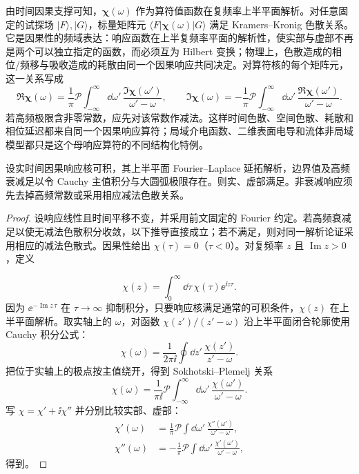 由时间因果支撑可知，$\boldsymbol\chi(\omega)$ 作为算符值函数在复频率上半平面解析。对任意固定的试探场 $|F\rangle,|G\rangle$，标量矩阵元
$\langle F|\boldsymbol\chi(\omega)|G\rangle$ 满足 Kramers--Kronig 色散关系。它是因果性的频域表达：响应函数在上半复频率平面的解析性，使实部与虚部不再是两个可以独立指定的函数，而必须互为 Hilbert 变换；物理上，色散造成的相位/频移与吸收造成的耗散由同一个因果响应共同决定。对算符核的每个矩阵元，这一关系写成
\begin{equation}
{
\Re\boldsymbol\chi(\omega)
=\frac1\pi\mathcal P\int_{-\infty}^{\infty}\dd\omega'\,
\frac{\Im\boldsymbol\chi(\omega')}{\omega'-\omega},
\qquad
\Im\boldsymbol\chi(\omega)
=-\frac1\pi\mathcal P\int_{-\infty}^{\infty}\dd\omega'\,
\frac{\Re\boldsymbol\chi(\omega')}{\omega'-\omega}.}
\label{eq:material_kramers_kronig}
\end{equation}
若高频极限含非零常数，应先对该常数作减法。这样时间色散、空间色散、耗散和相位延迟都来自同一个因果响应算符；局域介电函数、二维表面电导和流体非局域模型都只是这个母响应算符的不同结构化特例。

\begin{theorem}
设实时间因果响应核可积，其上半平面 Fourier--Laplace 延拓解析，边界值及高频衰减足以令 Cauchy 主值积分与大圆弧极限存在。则实、虚部满足。非衰减响应须先去掉高频常数或采用相应减法色散关系。
\end{theorem}
\begin{proof}
设响应线性且时间平移不变，并采用前文固定的 Fourier 约定。若高频衰减足以使无减法色散积分收敛，以下推导直接成立；若不满足，则对同一解析论证采用相应的减法色散式。因果性给出 $\chi(\tau)=0$（$\tau<0$）。对复频率 $z$ 且 $\operatorname{Im}z>0$，定义

\[
\chi(z)=\int_0^\infty\dd\tau\,\chi(\tau)\ee^{\ii z\tau}.
\]
因为 $\ee^{-\operatorname{Im}z\,\tau}$ 在 $\tau\to\infty$ 抑制积分，只要响应核满足通常的可积条件，$\chi(z)$ 在上半平面解析。取实轴上的 $\omega$，对函数 $\chi(z')/(z'-\omega)$ 沿上半平面闭合轮廓使用 Cauchy 积分公式：
\[
\chi(\omega)
=\frac{1}{2\pi\ii}
\oint\dd z'\,
\frac{\chi(z')}{z'-\omega}.
\]
把位于实轴上的极点按主值绕开，得到 Sokhotski--Plemelj 关系
\[
\chi(\omega)
=\frac{1}{\pi\ii}\mathcal P
\int_{-\infty}^{\infty}\dd\omega'\,
\frac{\chi(\omega')}{\omega'-\omega}.
\]
写 $\chi=\chi'+\ii\chi''$ 并分别比较实部、虚部：
\begin{align*}
\chi'(\omega)
&=\frac1\pi\mathcal P
\int\dd\omega'\,
\frac{\chi''(\omega')}{\omega'-\omega},\\
\chi''(\omega)
&=-\frac1\pi\mathcal P
\int\dd\omega'\,
\frac{\chi'(\omega')}{\omega'-\omega},
\end{align*}
得到。
\end{proof}


